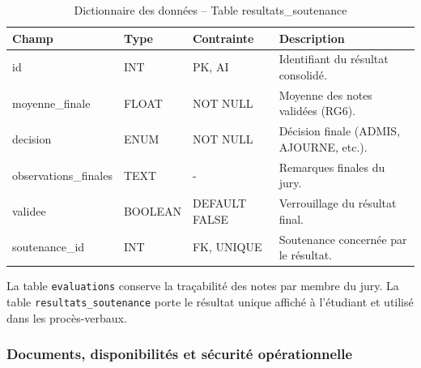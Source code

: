\documentclass[12pt,a4paper]{article}
\begin{document}
\begin{table}[H]
    \centering
    \small
    \begin{tabular}{lp{2cm}lp{6cm}}
        \toprule
        \rowcolor{primary!10}
        \textbf{Champ} & \textbf{Type} & \textbf{Contrainte} & \textbf{Description}                      \\
        \midrule
        id             & INT           & PK, AI              & Identifiant du résultat consolidé.        \\
        moyenne\_finale & FLOAT        & NOT NULL            & Moyenne des notes validées (RG6).         \\
        decision       & ENUM          & NOT NULL            & Décision finale (ADMIS, AJOURNE, etc.).   \\
        observations\_finales & TEXT   & -                   & Remarques finales du jury.                \\
        validee        & BOOLEAN       & DEFAULT FALSE       & Verrouillage du résultat final.           \\
        soutenance\_id & INT           & FK, UNIQUE          & Soutenance concernée par le résultat.     \\
        \bottomrule
    \end{tabular}
    \caption{Dictionnaire des données -- Table resultats\_soutenance}
\end{table}

La table \texttt{evaluations} conserve la traçabilité des notes par membre du
jury. La table \texttt{resultats\_soutenance} porte le résultat unique affiché à
l'étudiant et utilisé dans les procès-verbaux.

\subsubsection{Documents, disponibilités et sécurité opérationnelle}
\end{document}
